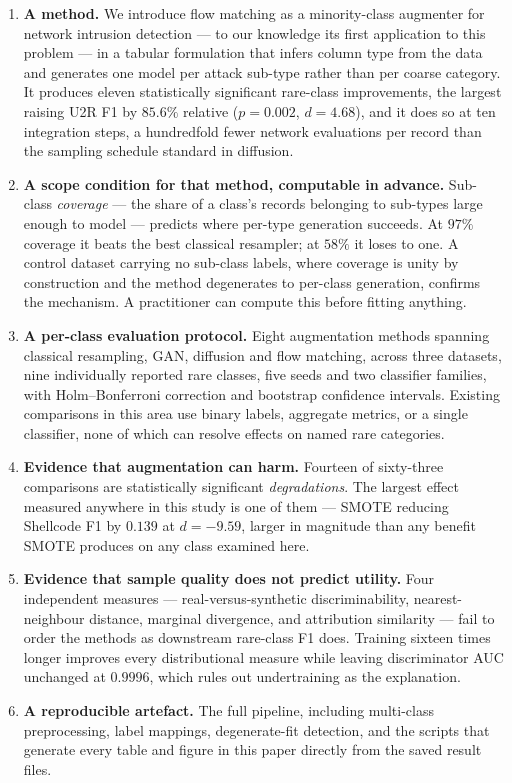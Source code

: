 \documentclass[11pt]{article}
\begin{document}
\begin{enumerate}
\item \textbf{A method.} We introduce flow matching as a minority-class augmenter for
network intrusion detection --- to our knowledge its first application to this
problem --- in a tabular formulation that infers column type from the data and
generates one model per attack sub-type rather than per coarse category. It produces
eleven statistically significant rare-class improvements, the largest raising U2R F1
by $85.6\%$ relative ($p=0.002$, $d=4.68$), and it does so at ten integration steps,
a hundredfold fewer network evaluations per record than the sampling schedule
standard in diffusion.

\item \textbf{A scope condition for that method, computable in advance.} Sub-class
\emph{coverage} --- the share of a class's records belonging to sub-types large
enough to model --- predicts where per-type generation succeeds. At $97\%$ coverage
it beats the best classical resampler; at $58\%$ it loses to one. A control dataset
carrying no sub-class labels, where coverage is unity by construction and the method
degenerates to per-class generation, confirms the mechanism. A practitioner can
compute this before fitting anything.

\item \textbf{A per-class evaluation protocol.} Eight augmentation methods spanning
classical resampling, GAN, diffusion and flow matching, across three datasets, nine
individually reported rare classes, five seeds and two classifier families, with
Holm--Bonferroni correction and bootstrap confidence intervals. Existing comparisons
in this area use binary labels, aggregate metrics, or a single classifier, none of
which can resolve effects on named rare categories.

\item \textbf{Evidence that augmentation can harm.} Fourteen of sixty-three
comparisons are statistically significant \emph{degradations}. The largest effect
measured anywhere in this study is one of them --- SMOTE reducing Shellcode F1 by
$0.139$ at $d=-9.59$, larger in magnitude than any benefit SMOTE produces on any
class examined here.

\item \textbf{Evidence that sample quality does not predict utility.} Four
independent measures --- real-versus-synthetic discriminability, nearest-neighbour
distance, marginal divergence, and attribution similarity --- fail to order the
methods as downstream rare-class F1 does. Training sixteen times longer improves
every distributional measure while leaving discriminator AUC unchanged at $0.9996$,
which rules out undertraining as the explanation.

\item \textbf{A reproducible artefact.} The full pipeline, including multi-class
preprocessing, label mappings, degenerate-fit detection, and the scripts that
generate every table and figure in this paper directly from the saved result files.
\end{enumerate}
\end{document}
